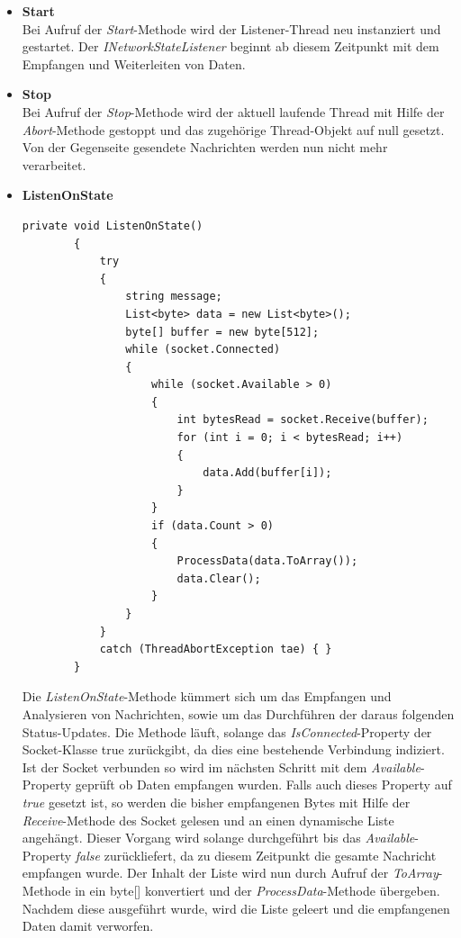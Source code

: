 \begin{itemize}
\item \textbf{Start}\\
Bei Aufruf der \textit{Start}-Methode wird der Listener-Thread neu instanziert und gestartet. Der  \textit{INetworkStateListener} beginnt ab diesem Zeitpunkt mit dem Empfangen und Weiterleiten von Daten. 
\item \textbf{Stop}\\
Bei Aufruf der \textit{Stop}-Methode wird der aktuell laufende Thread mit Hilfe der  \textit{Abort}-Methode gestoppt und das zugehörige Thread-Objekt auf null gesetzt. Von der Gegenseite gesendete Nachrichten werden nun nicht mehr verarbeitet.
\newpage
\item \textbf{ListenOnState}\\
\begin{lstlisting}[language = CSharp, captionpos=b, caption={Die ListenOnState-Methode}]
private void ListenOnState()
        {
            try
            {
                string message;
                List<byte> data = new List<byte>();
                byte[] buffer = new byte[512];
                while (socket.Connected)
                {
                    while (socket.Available > 0)
                    {
                        int bytesRead = socket.Receive(buffer);
                        for (int i = 0; i < bytesRead; i++)
                        {
                            data.Add(buffer[i]);
                        }
                    }
                    if (data.Count > 0)
                    {
                        ProcessData(data.ToArray());                        
                        data.Clear();
                    }
                }
            }
            catch (ThreadAbortException tae) { }
        }       
\end{lstlisting}
Die \textit{ListenOnState}-Methode kümmert sich um das Empfangen und Analysieren von Nachrichten, sowie um das Durchführen der daraus folgenden Status-Updates. 
Die Methode läuft, solange das \textit{IsConnected}-Property der Socket-Klasse true zurückgibt, da dies eine bestehende Verbindung indiziert. Ist der Socket verbunden so wird im nächsten Schritt mit dem \textit{Available}-Property geprüft ob Daten empfangen wurden. Falls auch dieses Property auf \textit{true} gesetzt ist, so werden die bisher empfangenen Bytes mit Hilfe der \textit{Receive}-Methode des Socket gelesen und an einen dynamische Liste angehängt. 
Dieser Vorgang wird solange durchgeführt bis das \textit{Available}-Property \textit{false} zurückliefert, da zu diesem Zeitpunkt die gesamte Nachricht empfangen wurde. Der Inhalt der Liste wird nun durch Aufruf der  \textit{ToArray}-Methode in ein byte[] konvertiert und der \textit{ProcessData}-Methode übergeben. Nachdem diese ausgeführt wurde, wird die Liste geleert und die empfangenen Daten damit verworfen.



\end{itemize}
